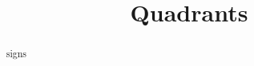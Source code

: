 \documentclass{ximera}
\title{Quadrants}
\begin{document}
\begin{abstract}
signs
\end{abstract}
\maketitle
\end{document}

